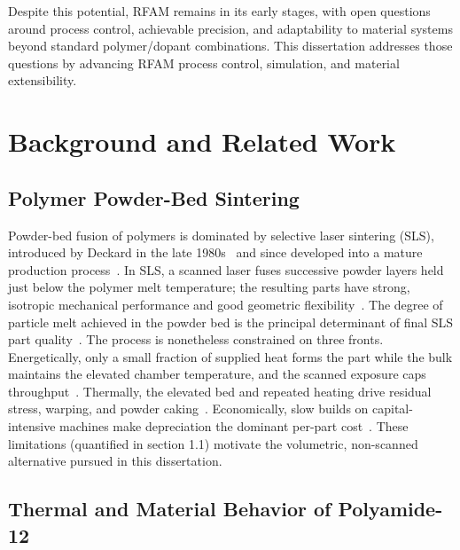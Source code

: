 Despite this potential, RFAM remains in its early stages, with open
questions around process control, achievable precision, and adaptability to
material systems beyond standard polymer/dopant combinations. This dissertation
addresses those questions by advancing RFAM process control, simulation, and
material extensibility.

\section{Background and Related Work}
\label{sec:intro_background}

\subsection{Polymer Powder-Bed Sintering}
\label{sec:intro_bg_sls}

Powder-bed fusion of polymers is dominated by selective laser sintering
(SLS), introduced by Deckard in the late 1980s~\cite{deckard1989method} and
since developed into a mature production
process~\cite{gibson2015additive,Beaman2020AdditiveMR,lupone2021process}. In
SLS, a scanned laser fuses successive powder layers held just below the
polymer melt temperature; the resulting parts have strong, isotropic mechanical
performance and good geometric flexibility~\cite{jabri2023comprehensive,peyre2015sls,xiao2024sls}.
The degree of particle melt achieved in the powder bed is the principal determinant
of final SLS part quality~\cite{Zarringhalam2009}. The
process is nonetheless constrained on three fronts. Energetically, only a small
fraction of supplied heat forms the part while the bulk maintains the elevated
chamber temperature, and the scanned exposure caps throughput~\cite{lupone2021process,deckard1995improved}.
Thermally, the elevated bed and repeated heating drive residual stress, warping,
and powder caking~\cite{bourell2014performance}.
Economically, slow builds on capital-intensive machines make depreciation the
dominant per-part cost~\cite{khajavi2014spareparts,baumers2011capacityutilization,lindemann2012lifecyclecosts,rickenbacher2013slmcostmodel,yao2016cost}.
These limitations (quantified in section 1.1) motivate the
volumetric, non-scanned alternative pursued in this dissertation.

\subsection{Thermal and Material Behavior of Polyamide-12}
\label{sec:intro_bg_pa12}


